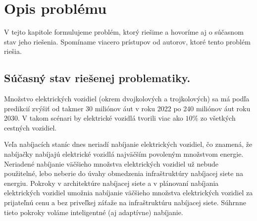 

% 

\chapter{Opis problému}

V tejto kapitole formulujeme problém, ktorý riešime a hovoríme aj o súčasnom stav jeho riešenia. Spomíname viacero prístupov od autorov, ktoré tento problém riešia.








\section{Súčasný stav riešenej problematiky.}
\label{sucasny-stav}
Množstvo elektrických vozidiel (okrem dvojkolových a trojkolových) sa má podľa predikcií \cite{iea2023} zvýšiť od takmer 30 miliónov áut v roku 2022 po 240 miliónov áut roku 2030. V takom scénari by elektrické vozidlá tvorili viac ako $10\%$ zo všetkých cestných vozidiel.  \cite{iea2023} 





Veľa nabíjacích staníc dnes neriadí nabíjanie elektrických vozidiel, čo znamená, že nabíjačky nabíjajú elektrické vozidlá najväčším povoleným množstvom energie. Neriadené nabíjanie väčšieho množstva elektrických vozidiel už nebude použitelné, lebo neberie do úvahy obmedzenia infraštruktúry nabíjacej siete na energiu. \cite{lee2021acnsim} Pokroky v architektúre nabíjacej siete a v plánovaní nabíjania elektrických vozidiel umožnia nabíjanie väčšieho množstva  elektrických vozidiel za prijateľnú cenu a bez priveľkej záťaže na infraštruktúru nabíjacej siete. Súhrnne tieto pokroky voláme inteligentné (aj adaptívne) nabíjanie. \cite{lee2021adaptivephd,Lee2018LargeScaleAE}


